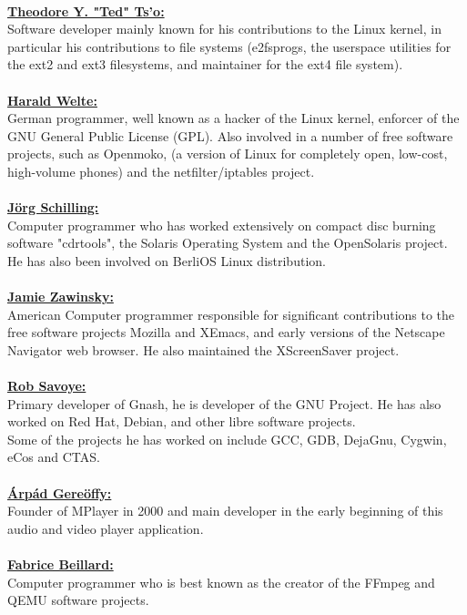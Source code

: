 \documentclass[10pt, a4paper, oneside]{report}
\begin{document}
\\
\textbf{\underline{Theodore Y. "Ted" Ts'o:}}\\
Software developer mainly known for his contributions to the Linux kernel, in particular his contributions to file systems (e2fsprogs, the userspace utilities for the ext2 and ext3 filesystems, and maintainer for the ext4 file system).\\
\\
\textbf{\underline{Harald Welte:}}\\
German programmer, well known as a hacker of the Linux kernel, enforcer of the GNU General Public License (GPL).  Also involved in a number of free software projects, such as Openmoko, (a version of Linux for completely open, low-cost, high-volume phones) and the netfilter/iptables project.\\
\\
\textbf{\underline{Jörg Schilling:}}\\
Computer programmer who has worked extensively on compact disc burning software "cdrtools", the Solaris Operating System and the OpenSolaris project. He has also been involved on BerliOS Linux distribution.\\
\\
\textbf{\underline{Jamie Zawinsky:}}\\
American Computer programmer responsible for significant contributions to the free software projects Mozilla and XEmacs, and early versions of the Netscape Navigator web browser. He also maintained the XScreenSaver project.\\
\\
\textbf{\underline{Rob Savoye:}}\\
Primary developer of Gnash, he is developer of the GNU Project. He has also worked on Red Hat, Debian, and other libre software projects.\\
Some of the projects he has worked on include GCC, GDB, DejaGnu, Cygwin, eCos and CTAS.\\
\\
\textbf{\underline{Árpád Gereöffy:}}\\ 
Founder of MPlayer in 2000 and main developer in the early beginning of this audio and video player application.\\
\\
\textbf{\underline{Fabrice Beillard:}}\\
Computer programmer who is best known as the creator of the FFmpeg and QEMU software projects.\\
\\
\end{document}
